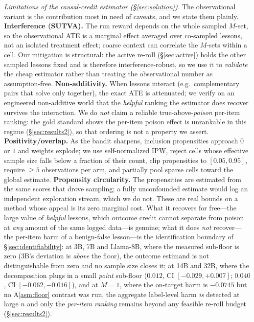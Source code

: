 \documentclass[10pt,twocolumn]{article}
\begin{document}
\medskip\noindent\emph{Limitations of the causal-credit estimator
(\S\ref{sec:solution}).} The observational variant is the contribution most in need
of caveats, and we state them plainly.
\textbf{Interference (SUTVA).} The run reward depends on the whole sampled $M$-set,
so the observational ATE is a marginal effect averaged over co-sampled lessons, not
an isolated treatment effect; coarse context can correlate the $M$-sets within a
cell. Our mitigation is structural: the active re-roll (\S\ref{sec:active}) holds the
other sampled lessons fixed and is therefore interference-robust, so we use it to
\emph{validate} the cheap estimator rather than treating the observational number as
assumption-free. \textbf{Non-additivity.} When lessons interact (e.g.\
complementary pairs that solve only together), the exact ATE is attenuated; we
verify on an engineered non-additive world that the \emph{helpful} ranking the estimator
does recover survives the interaction. We do \emph{not} claim a reliable
true-above-\emph{poison} per-item ranking: the gold standard shows the per-item poison
effect is unrankable in this regime (\S\ref{sec:results2}), so that ordering is not a
property we assert. \textbf{Positivity/overlap.} As the bandit sharpens, inclusion
propensities approach $0$ or $1$ and weights explode; we use self-normalized IPW,
reject cells whose effective sample size falls below a fraction of their count, clip
propensities to $[0.05,0.95]$, require $\ge 5$ observations per arm, and partially
pool sparse cells toward the global estimate. \textbf{Propensity circularity.} The
propensities are estimated from the same scores that drove sampling; a fully
unconfounded estimate would log an independent exploration stream, which we do not.
These are real bounds on a method whose appeal is its zero marginal cost. What it
recovers for free---the large value of \emph{helpful} lessons, which outcome credit
cannot separate from poison at \emph{any} amount of the same logged data---is genuine;
what it does \emph{not} recover---the per-item harm of a benign-false lesson---is the
identification boundary of \S\ref{sec:identifiability}: at 3B, 7B and Llama-8B, where the
measured sub-floor is zero (3B's deviation is \emph{above} the floor), the outcome
estimand is not distinguishable from zero and no sample size closes it; at 14B and 32B,
where the decomposition plugs in a small \emph{point} sub-floor ($0.012$, CI
$[-0.029,+0.007]$; $0.040$, CI $[-0.062,-0.016]$), and at $M{=}1$, where the on-target
harm is $-0.0745$ but no A\ref{asm:floor} contrast was run, the aggregate label-level
harm \emph{is} detected at large $n$ and only the \emph{per-item ranking} remains beyond any feasible re-roll
budget (\S\ref{sec:results2}).
\end{document}
